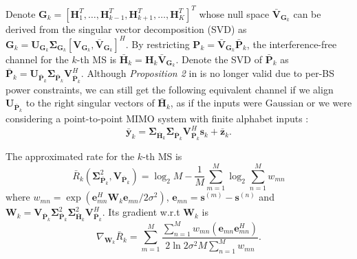 \documentclass{article}
\begin{document}
    Denote $\mathbf{G}_k=[\mathbf{H}_1^T,\ldots,\mathbf{H}_{k-1}^T,\mathbf{H}_{k+1}^T, \ldots , \mathbf{H}_{K}^T]^T$
    whose null space $\bar{\mathbf{V}}_{\mathbf{G}_k}$ can be derived from the singular vector decomposition (SVD) as $\mathbf{G}_k = \mathbf{U}_{\mathbf{G}_k}
    \bm{\Sigma}_{\mathbf{G}_k}[\mathbf{V}_{\mathbf{G}_k},\bar{\mathbf{V}}_{\mathbf{G}_k}]^H$. By restricting $\mathbf{P}_k = \bar{\mathbf{V}}_{\mathbf{G}_k}\bar{\mathbf{P}}_k$,
the interference-free channel for the $k$-th MS is $\bar{\mathbf{H}}_k = \mathbf{H}_k\bar{\mathbf{V}}_{\mathbf{G}_k}$.
Denote the SVD of $\bar{\mathbf{P}}_k$ as $\bar{\mathbf{P}}_k = \mathbf{U}_{\bar{\mathbf{P}}_k}\mathbf{\Sigma}_{\bar{\mathbf{P}}_k}\mathbf{V}_{\bar{\mathbf{P}}_k}^H$.
Although \emph{Proposition 2} in \cite{xiao2011globally} is no longer valid due to per-BS power constraints, we can still get the following equivalent channel if
we align $\mathbf{U}_{\bar{\mathbf{P}}_k}$ to the right singular vectors of $\bar{\mathbf{H}}_k$, as if the inputs were Gaussian or we were considering a point-to-point MIMO system with finite alphabet inputs \cite{payaro2009optimal}:
    \begin{equation}
        \label{eq:channelBDEQ}
        \bar{\mathbf{y}}_k=\mathbf{\Sigma}_{\bar{\mathbf{H}}_k}\mathbf{\Sigma}_{\bar{\mathbf{P}}_k}\mathbf{V}_{\bar{\mathbf{P}}_k}^H\mathbf{s}_k+\bar{\mathbf{z}}_k.
    \end{equation}

    The approximated rate for the $k$-th MS is \cite{zeng2012low}
    \begin{equation}
        \label{eq:ARBDAGDP}
        \bar{R}_k(\mathbf{\Sigma}_{\bar{\mathbf{P}}_k}^2,\mathbf{V}_{\bar{\mathbf{P}}_k}) = \log_2M - \frac{1}{M}\sum_{m=1}^{M}\log_2\sum_{n=1}^Mw_{mn}
    \end{equation}
    where $w_{mn} = \exp(\mathbf{e}_{mn}^H\mathbf{W}_k\mathbf{e}_{mn}/2\sigma^2)$, $\mathbf{e}_{mn}=\mathbf{s}^{(m)}-\mathbf{s}^{(n)}$ and $\mathbf{W}_k=\mathbf{V}_{\bar{\mathbf{P}}_k}\mathbf{\Sigma}_{\bar{\mathbf{P}}_k}^2\mathbf{\Sigma}_{\bar{\mathbf{H}}_k}^2\mathbf{V}_{\bar{\mathbf{P}}_k}^H$. Its gradient w.r.t $\mathbf{W}_k$ is
    \begin{equation}
        \label{eq:gradWARBDAGDP}
        \nabla_{\mathbf{W}_k}\bar{R}_k=\sum_{m=1}^M\frac{\sum_{n=1}^Mw_{mn}(\mathbf{e}_{mn}\mathbf{e}_{mn}^H)}{2\ln2\sigma^2M\sum_{n=1}^Mw_{mn}}.
 \end{equation}
\end{document}
